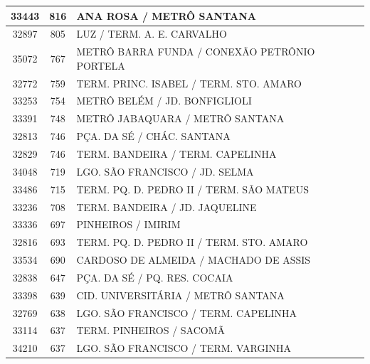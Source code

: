 \documentclass[
	12pt,				%
	oneside,			%
	a4paper,			%
	english,			%
	brazil				%
	]{abntex2ppgsi}
\begin{document}
{{\begin{apendicesenv}
\begin{longtable}{c|c|p{7cm}}
    33443 & 816   & ANA ROSA / METRÔ SANTANA \\
\hline

    32897 & 805   & LUZ / TERM. A. E. CARVALHO \\
\hline

    35072 & 767   & METRÔ BARRA FUNDA / CONEXÃO PETRÔNIO PORTELA \\
\hline

    32772 & 759   & TERM. PRINC. ISABEL / TERM. STO. AMARO \\
\hline

    33253 & 754   & METRÔ BELÉM / JD. BONFIGLIOLI \\
\hline

    33391 & 748   & METRÔ JABAQUARA / METRÔ SANTANA \\
\hline

    32813 & 746   & PÇA. DA SÉ / CHÁC. SANTANA \\
\hline

    32829 & 746   & TERM. BANDEIRA / TERM. CAPELINHA \\
\hline

    34048 & 719   & LGO. SÃO FRANCISCO / JD. SELMA \\
\hline

    33486 & 715   & TERM. PQ. D. PEDRO II / TERM. SÃO MATEUS \\
\hline

    33236 & 708   & TERM. BANDEIRA / JD. JAQUELINE \\
\hline

    33336 & 697   & PINHEIROS / IMIRIM \\
\hline

    32816 & 693   & TERM. PQ. D. PEDRO II / TERM. STO. AMARO \\
\hline

    33534 & 690   & CARDOSO DE ALMEIDA / MACHADO DE ASSIS \\
\hline

    32838 & 647   & PÇA. DA SÉ / PQ. RES. COCAIA \\
\hline

    33398 & 639   & CID. UNIVERSITÁRIA / METRÔ SANTANA \\
\hline

    32769 & 638   & LGO. SÃO FRANCISCO / TERM. CAPELINHA \\
\hline

    33114 & 637   & TERM. PINHEIROS / SACOMÃ \\
\hline

    34210 & 637   & LGO. SÃO FRANCISCO / TERM. VARGINHA \\
\hline


\end{longtable}
\end{apendicesenv}}}
\end{document}
